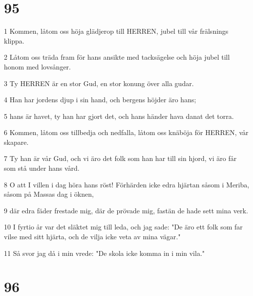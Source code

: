 \chapter{95}

\par 1 Kommen, låtom oss höja glädjerop till HERREN, jubel till vår frälsnings klippa.
\par 2 Låtom oss träda fram för hans ansikte med tacksägelse och höja jubel till honom med lovsånger.
\par 3 Ty HERREN är en stor Gud, en stor konung över alla gudar.
\par 4 Han har jordens djup i sin hand, och bergens höjder äro hans;
\par 5 hans är havet, ty han har gjort det, och hans händer hava danat det torra.
\par 6 Kommen, låtom oss tillbedja och nedfalla, låtom oss knäböja för HERREN, vår skapare.
\par 7 Ty han är vår Gud, och vi äro det folk som han har till sin hjord, vi äro får som stå under hans vård.
\par 8 O att I villen i dag höra hans röst! Förhärden icke edra hjärtan såsom i Meriba, såsom på Massas dag i öknen,
\par 9 där edra fäder frestade mig, där de prövade mig, fastän de hade sett mina verk.
\par 10 I fyrtio år var det släktet mig till leda, och jag sade: "De äro ett folk som far vilse med sitt hjärta, och de vilja icke veta av mina vägar."
\par 11 Så svor jag då i min vrede: "De skola icke komma in i min vila."

\chapter{96}

